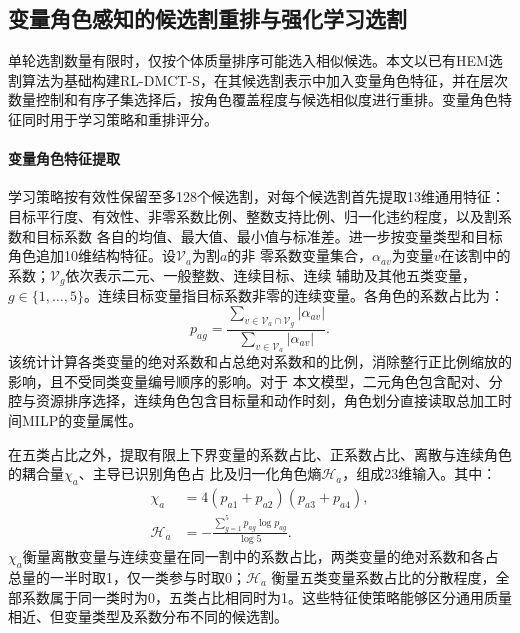 \documentclass[preprint,12pt,nonatbib]{elsarticle}
\begin{document}
\subsection{变量角色感知的候选割重排与强化学习选割}
\label{sec:hem-extension-cn}

单轮选割数量有限时，仅按个体质量排序可能选入相似候选。本文以已有HEM选割算法\citep{wang2023hem}为基础构建RL-DMCT-S，在其候选割表示中加入变量角色特征，并在层次数量控制和有序子集选择后，按角色覆盖程度与候选相似度进行重排。变量角色特征同时用于学习策略和重排评分。

\paragraph{变量角色特征提取}
学习策略按有效性保留至多128个候选割，对每个候选割首先提取13维通用特征：目标平行度、有效性、非零系数比例、整数支持比例、归一化违约程度，以及割系数和目标系数
各自的均值、最大值、最小值与标准差。进一步按变量类型和目标角色追加10维结构特征。设$\mathcal V_a$为割$a$的非
零系数变量集合，$\alpha_{av}$为变量$v$在该割中的系数；$\mathcal V_g$依次表示二元、一般整数、连续目标、连续
辅助及其他五类变量，$g\in\{1,\ldots,5\}$。连续目标变量指目标系数非零的连续变量。各角色的系数占比为：
\begin{equation}
p_{ag}=\frac{\sum_{v\in\mathcal V_a\cap\mathcal V_g}|\alpha_{av}|}
{\sum_{v\in\mathcal V_a}|\alpha_{av}|}.
\label{eq:role-profile-cn}
\end{equation}
该统计计算各类变量的绝对系数和占总绝对系数和的比例，消除整行正比例缩放的影响，且不受同类变量编号顺序的影响。对于
本文模型，二元角色包含配对、分腔与资源排序选择，连续角色包含目标量和动作时刻，角色划分直接读取总加工时间MILP的变量属性。

在五类占比之外，提取有限上下界变量的系数占比、正系数占比、离散与连续角色的耦合量$\chi_a$、主导已识别角色占
比及归一化角色熵$\mathcal H_a$，组成23维输入。其中：
\begin{equation}
\begin{aligned}
\chi_a&=4(p_{a1}+p_{a2})(p_{a3}+p_{a4}),\\
\mathcal H_a&=-\frac{\sum_{g=1}^{5}p_{ag}\log p_{ag}}{\log5}.
\end{aligned}
\label{eq:role-information-cn}
\end{equation}
$\chi_a$衡量离散变量与连续变量在同一割中的系数占比，两类变量的绝对系数和各占总量的一半时取1，仅一类参与时取0；$\mathcal H_a$
衡量五类变量系数占比的分散程度，全部系数属于同一类时为0，五类占比相同时为1。这些特征使策略能够区分通用质量相近、但变量类型及系数分布不同的候选割。
\end{document}
